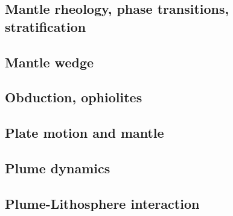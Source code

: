 \subsection*{Mantle rheology, phase transitions, stratification}

\noindent
\cite{yusb82}
\cite{zhyh92}
\cite{tasg93}
\cite{zhyu95}
\cite{pazw07}
\cite{java11}
\cite{tack12}

\subsection*{Mantle wedge}

\noindent
\cite{tosl78}
\cite{bigu01}
\cite{leki09}
\cite{roms10}
\cite{ledg14}

\subsection*{Obduction, ophiolites}

\noindent
\cite{hack90}
\cite{hack91}
\cite{agzf14}

\subsection*{Plate motion and mantle}

\noindent
\cite{zieg92a}
\cite{zhgm98}
\cite{lizh09}
\cite{huss12}
\cite{yoha15}

\subsection*{Plume dynamics}

\noindent
\cite{nasf94}\cite{hayu94}
\cite{lays99}
\cite{isst06}
\cite{toyu11}\cite{talz11}\cite{burk11}
\cite{dagm13}
\cite{daso15}
\cite{dacc18}

\subsection*{Plume-Lithosphere interaction}

\noindent
\cite{rich94}
\cite{bugu05}
\cite{buge14}

